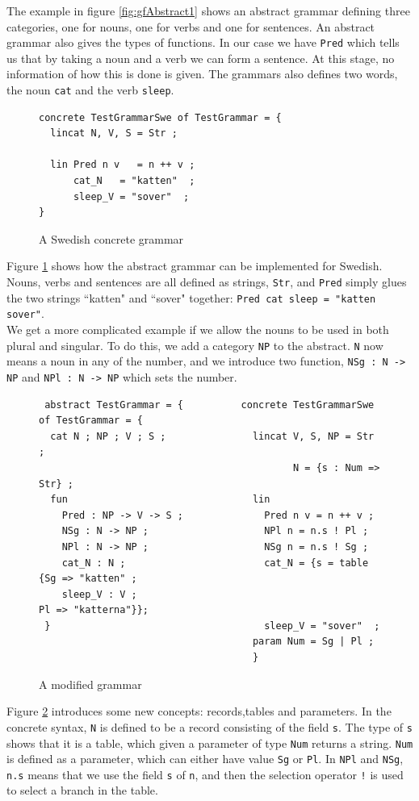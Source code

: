 \documentclass{report}
\begin{document}
The example in figure \ref{fig:gfAbstract1} shows an abstract grammar defining three categories, %
one for nouns, one for verbs and one for sentences. An abstract grammar also gives
the types of functions. In our case we have \verb|Pred| which
tells us that by taking a noun and a verb we can form a sentence. At this stage, 
no information of how this is done is given. The grammars also defines two words,
the noun \verb|cat| and the verb \verb|sleep|. 

\begin{figure}[h]
\begin{verbatim}
concrete TestGrammarSwe of TestGrammar = {
  lincat N, V, S = Str ;
   
  lin Pred n v   = n ++ v ;
      cat_N   = "katten"  ;
      sleep_V = "sover"  ;
}
\end{verbatim}
\caption{A Swedish concrete grammar}
\label{fig:gfSweCnc1}
\end{figure}

Figure \ref{fig:gfSweCnc1} shows how the abstract grammar can be implemented
for Swedish. Nouns, verbs and sentences are all defined as strings, \verb|Str|,
and \verb|Pred| simply glues the two strings ``katten" and ``sover" together:
\verb|Pred cat sleep = "katten sover"|.\\
We get a more complicated example if we allow the nouns to be used in both
plural and singular. To do this, we add a category \verb|NP| to the
abstract. \verb|N| now means a noun
in any of the number, and we introduce two function, \verb|NSg : N -> NP| and
\verb|NPl : N -> NP| which sets the number.
\begin{figure}[h!]
\begin{verbatim}              
 abstract TestGrammar = {          concrete TestGrammarSwe of TestGrammar = {
  cat N ; NP ; V ; S ;               lincat V, S, NP = Str ;
                                            N = {s : Num => Str} ;
  fun                                lin   
    Pred : NP -> V -> S ;              Pred n v = n ++ v ;
    NSg : N -> NP ;                    NPl n = n.s ! Pl ;
    NPl : N -> NP ;                    NSg n = n.s ! Sg ;
    cat_N : N ;                        cat_N = {s = table {Sg => "katten" ;
    sleep_V : V ;                                          Pl => "katterna"}};
 }                                     sleep_V = "sover"  ;
                                     param Num = Sg | Pl ;
                                     }
\end{verbatim}           
\caption{A modified grammar}
\label{fig:gfTest2}
\end{figure}
Figure \ref{fig:gfTest2} introduces some new concepts: records,tables and parameters.
In the concrete syntax, \verb|N| is defined to be a record consisting of the field
\verb|s|. The type of \verb|s| shows that it is a table, which given a parameter of type \verb|Num| returns
a string. \verb|Num| is defined as a parameter, which can either have value \verb|Sg|
or \verb|Pl|. In \verb|NPl| and \verb|NSg|, \verb|n.s| means that we use the
field \verb|s| of \verb|n|, and then the selection operator \verb|!| is used to
select a branch in the table.
\end{document}

